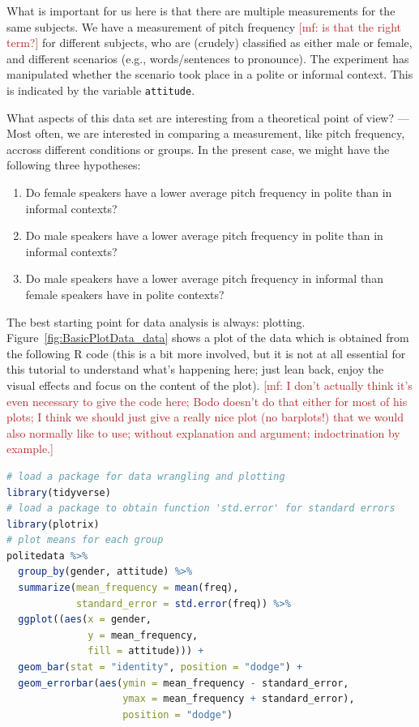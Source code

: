 \documentclass[nobib]{tufte-handout}
\renewcommand{\mf}[1]{\textcolor{firebrick}{[mf: #1]}}
\begin{document}
\medskip

\noindent What is important for us here is that there are multiple measurements for the same subjects. We have a measurement of pitch frequency \mf{is that the right term?} for different subjects, who are (crudely) classified as either male or female, and different scenarios (e.g., words/sentences to pronounce). The experiment has manipulated whether the scenario took place in a polite or informal context. This is indicated by the variable \texttt{attitude}.

What aspects of this data set are interesting from a theoretical point of view? --- Most often, we are interested in comparing a measurement, like pitch frequency, accross different conditions or groups. In the present case, we might have the following three hypotheses:

\begin{enumerate}[{H}1:]
\item Do female speakers have a lower average pitch frequency in polite than in informal contexts?
\item Do male speakers have a lower average pitch frequency in polite than in informal contexts?
\item Do male speakers have a lower average pitch frequency in informal than female speakers have in polite contexts?
\end{enumerate}

\noindent The best starting point for data analysis is always: plotting. Figure~\ref{fig:BasicPlotData_data} shows a plot of the data which is obtained from the following R code (this is a bit more involved, but it is not at all essential for this tutorial to understand what's happening here; just lean back, enjoy the visual effects and focus on the content of the plot). \mf{I don't actually think it's even necessary to give the code here; Bodo doesn't do that either for most of his plots; I think we should just give a really nice plot (no barplots!) that we would also normally like to use; without explanation and argument; indoctrination by example.}



\medskip

\begin{lstlisting}[language=R]
# load a package for data wrangling and plotting
library(tidyverse)
# load a package to obtain function 'std.error' for standard errors
library(plotrix)
# plot means for each group
politedata %>% 
  group_by(gender, attitude) %>% 
  summarize(mean_frequency = mean(freq),
            standard_error = std.error(freq)) %>% 
  ggplot((aes(x = gender, 
              y = mean_frequency, 
              fill = attitude))) + 
  geom_bar(stat = "identity", position = "dodge") +
  geom_errorbar(aes(ymin = mean_frequency - standard_error,
                    ymax = mean_frequency + standard_error), 
                    position = "dodge")
\end{lstlisting}
\end{document}
